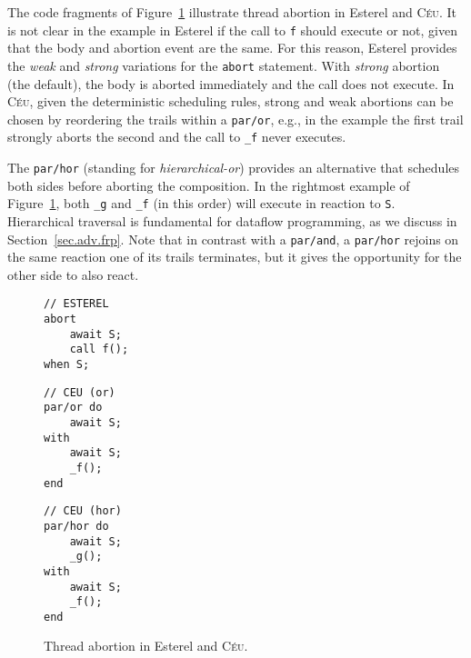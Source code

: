 \documentclass{acm_proc_article-sp}
\newcommand{\CEU}{\textsc{C\'{e}u}\xspace}
\newcommand{\code}[1] {{\small{\texttt{#1}}}}
\newcommand{\1}{\;}
\newcommand{\2}{\;\;}
\newcommand{\3}{\;\;\;}
\newcommand{\5}{\;\;\;\;\;}
\begin{document}
The code fragments of Figure~\ref{lst.abortion} illustrate thread abortion in 
Esterel and \CEU.
%
It is not clear in the example in Esterel if the call to \code{f} should 
execute or not, given that the body and abortion event are the same.
%
For this reason, Esterel provides the \emph{weak} and \emph{strong} variations 
for the \code{abort} statement.
With \emph{strong} abortion (the default), the body is aborted immediately and 
the call does not execute.
%
In \CEU, given the deterministic scheduling rules, strong and weak abortions 
can be chosen by reordering the trails within a \code{par/or}, e.g., in the 
example the first trail strongly aborts the second and the call to \code{\_f} 
never executes.

The \code{par/hor} (standing for \emph{hierarchical-or}) provides an 
alternative that schedules both sides before aborting the composition.
In the rightmost example of Figure~\ref{lst.abortion}, both \code{\_g} and 
\code{\_f} (in this order) will execute in reaction to \code{S}.
Hierarchical traversal is fundamental for dataflow programming, as we discuss 
in Section~\ref{sec.adv.frp}.
Note that in contrast with a \code{par/and}, a \code{par/hor} rejoins on the 
same reaction one of its trails terminates, but it gives the opportunity for 
the other side to also react.

\begin{figure}[h]
\begin{minipage}[t]{0.32\linewidth}
\begin{lstlisting}
// ESTEREL
abort
    await S;
    call f();
when S;
\end{lstlisting}
\end{minipage}
%
\begin{minipage}[t]{0.32\linewidth}
\begin{lstlisting}
// CEU (or)
par/or do
    await S;
with
    await S;
    _f();
end
\end{lstlisting}
\end{minipage}
%
\begin{minipage}[t]{0.32\linewidth}
\begin{lstlisting}
// CEU (hor)
par/hor do
    await S;
    _g();
with
    await S;
    _f();
end
\end{lstlisting}
\end{minipage}
\caption{ Thread abortion in Esterel and \CEU. %
\label{lst.abortion}
}
\end{figure}
\begin{comment}
{\small
With strong abortion (default in Esterel), the call to \code{f1} is not 
executed (the \code{abort} can instead be prefixed with the \code{weak} 
keyword).
In \CEU, the \code{par/xor} provides strong and weak abortion depending on the 
chosen order for the trails.
The \code{par/or} provides XXX.
}
\end{comment}
\end{document}
